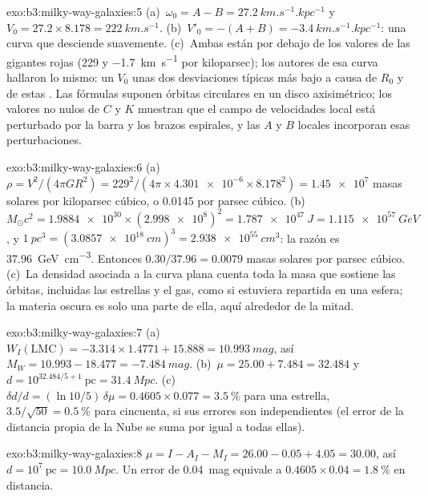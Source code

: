 \begin{solution}{exo:b3:milky-way-galaxies:5}
(a)~$\omega_0 = A - B = \qty{27.2}{km.s^{-1}.kpc^{-1}}$ y $V_0 =
27.2\times8.178 = \qty{222}{km.s^{-1}}$. (b)~$V'_0 = -(A + B) =
\qty{-3.4}{km.s^{-1}.kpc^{-1}}$: una curva que desciende suavemente. (c)~Ambas están
por debajo de los valores de las gigantes rojas (229 y \qty{-1.7}{km.s^{-1}} por
kiloparsec); los autores de esa curva hallaron lo mismo: un $V_0$ unas dos
desviaciones típicas más bajo a causa de $R_0$ y de estas . Las
fórmulas suponen órbitas circulares en un disco axisimétrico; los valores no nulos de $C$ y
$K$ muestran que el campo de velocidades local está perturbado por la barra y los
brazos espirales, y las $A$ y $B$ locales incorporan esas perturbaciones.
\end{solution}

\begin{solution}{exo:b3:milky-way-galaxies:6}
(a)~$\rho = V^2/(4\pi GR^2) = 229^2/(4\pi\times\num{4.301e-6}\times
8.178^2) = \num{1.45e7}$ masas solares por kiloparsec cúbico, o
\num{0.0145} por parsec cúbico. (b)~$M_\odot c^2 = \num{1.9884e30}\times
(\num{2.998e8})^2 = \qty{1.787e47}{J} = \qty{1.115e57}{GeV}$, y
$\qty{1}{pc^3} = (\qty{3.0857e18}{cm})^3 = \qty{2.938e55}{cm^3}$: la
razón es \qty{37.96}{GeV.cm^{-3}}. Entonces $0.30/37.96 = \num{0.0079}$ masas solares
por parsec cúbico. (c)~La densidad asociada a la curva plana cuenta toda la masa
que sostiene las órbitas, incluidas las estrellas y el gas, como si estuviera repartida en una
esfera; la materia oscura es solo una parte de ella, aquí alrededor de la mitad.
\end{solution}

\begin{solution}{exo:b3:milky-way-galaxies:7}
(a)~$W_I(\mathrm{LMC}) = -3.314\times1.4771 + 15.888 = \qty{10.993}{mag}$,
así $M_W = 10.993 - 18.477 = \qty{-7.484}{mag}$. (b)~$\mu = 25.00 + 7.484 =
32.484$ y $d = 10^{32.484/5 + 1}~\mathrm{pc} = \qty{31.4}{Mpc}$.
(c)~$\delta d/d = (\ln 10/5)\,\delta\mu = 0.4605\times0.077 =
\qty{3.5}{\percent}$ para una estrella, $3.5/\sqrt{50} = \qty{0.5}{\percent}$
para cincuenta, si sus errores son independientes (el error de la distancia propia de la Nube
se suma por igual a todas ellas).
\end{solution}

\begin{solution}{exo:b3:milky-way-galaxies:8}
$\mu = I - A_I - M_I = 26.00 - 0.05 + 4.05 = 30.00$, así $d =
10^{7}~\mathrm{pc} = \qty{10.0}{Mpc}$. Un error de \qty{0.04}{mag} equivale a
$0.4605\times0.04 = \qty{1.8}{\percent}$ en distancia.
\end{solution}

